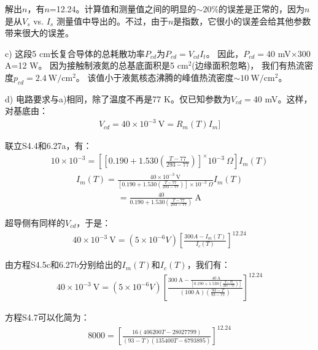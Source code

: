 解出$n$，有$n$=12.24。计算值和测量值之间的明显的$\sim 20\%$的误差是正常的，因为$n$是从$V_s$ vs. $I_s$
测量值中导出的。不过，由于$n$是指数，它很小的误差会给其他参数带来很大的误差。

c) 这段5 cm长复合导体的总耗散功率$P_{cd}$为$P_{cd}=V_{cd}I_t$。
因此，$P_{cd}=$40 mV$\times$300 A=12 W。
因为接触制液氮的总基底面积是5 $\mathrm{cm^2}$(边缘面积忽略)，
我们有热流密度$p_{cd}=2.4\ \mathrm{W/cm^2}$。
该值小于液氮核态沸腾的峰值热流密度$\sim 10\ \mathrm{W/cm^2}$。

d) 电路要求与a)相同，除了温度不再是77 K。仅已知参数为$V_{cd}=$40 mV。这样，对基底由：
\begin{align*}%
V_{cd}=40\times10^{-3}\ \mathrm{V}=R_m(T)I_m ]\tag{S4.4}
\end{align*}

联立S4.4和6.27a，有：
\begin{align*}%
10\times10^{-3}=[{[0.190+1.530(\frac{T-77}{293-77})]^\times10^{-3}\ \Omega}]I_m(T) \tag{S4.5a}
\end{align*}
\begin{align*}%
I_m(T)=\frac{40\times10^{-3}\ \mathrm{V}}{[0.190+1.530(\frac{T-77}{293-77})]\times10^{-3}\ \Omega}I_m(T) \tag{S4.5b}
\end{align*}
\begin{align*}%
=\frac{40}{0.190+1.530(\frac{T-77}{293-77})}\ \mathrm{A} \tag{S4.5c}
\end{align*}

超导侧有同样的$V_{cd}$，于是：
\begin{align*}%
40\times10^{-3}\ \mathrm{V}=(5\times10^{-6}V)[\frac{300A-I_m(T)}{I_c(T)}]^{12.24} \tag{S4.6}
\end{align*}

由方程S4.5c和6.27b分别给出的$I_m(T)$和$I_c(T)$，我们有：
\begin{align*}%
40\times10^{-3}\ \mathrm{V}=(5\times10^{-6}V)[\frac{300\ \mathrm{A}-\frac{40\ \mathrm{A}}{[0.190+1.530(\frac{T-77}{293-77})]}}{(100\ \mathrm{A})(\frac{93-T}{93-77})}]^{12.24}\tag{S4.7}
\end{align*}

方程S4.7可以化简为：
\begin{align*}%
8000=[\frac{16(406200T-28027799)}{(93-T)(135400T-6793895)}]^{12.24} \tag{S4.8}
\end{align*}

